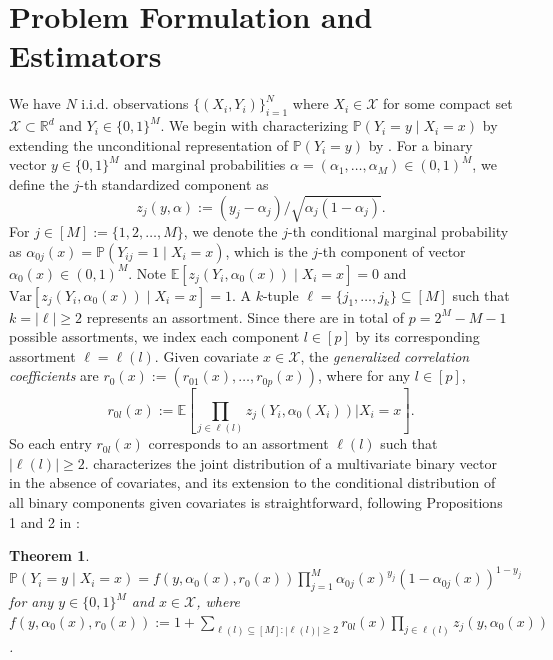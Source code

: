 \documentclass[11pt]{article}
\newtheorem{theorem}{Theorem}
\begin{document}
\section{Problem Formulation and Estimators}\label{Sec:Setup}
We have $N$ i.i.d. observations $\{(X_i,Y_i)\}_{i=1}^N$ where $X_i\in\mathcal{X}$ for some compact set $\mathcal{X}\subset\mathbb{R}^d$ and $Y_i \in\{0,1\}^M$. We begin with characterizing $\mathbb{P}(Y_i = y \mid X_i = x)$ by extending the unconditional representation of $\mathbb{P}(Y_i = y)$ by \citet{bahadur1959representation}. For a binary vector $y \in \{0,1\}^M$ and marginal probabilities $\alpha=(\alpha_1,\ldots,\alpha_M)\in (0,1)^M$, we define the $j$-th standardized component as 
\begin{equation}\label{eq:z}
\displaystyle z_j(y,\alpha):=(y_{j}-\alpha_j)/\sqrt{\alpha_j(1-\alpha_j)}.
\end{equation}
For $j\in[M]:=\{1,2,\ldots,M\}$, we denote the $j$-th conditional marginal probability as $\alpha_{0j}(x) = \mathbb{P}(Y_{ij}=1 \mid X_i=x)$, which is the $j$-th component of vector $\alpha_0(x)\in(0,1)^M$. Note $\mathbb{E}[ z_j(Y_i,\alpha_0(x))\mid X_i=x]=0$ and $\mathrm{Var}[ z_j(Y_i,\alpha_0(x))\mid X_i=x]=1$. A $k$-tuple $ \ell = \{j_1,\ldots,j_k\} \subseteq [M]$ such that $k=|\ell|\geq 2$ represents an assortment. Since there are in total of $p=2^M-M-1$ possible assortments, we index each component $l \in [p]$ by its corresponding assortment $\ell = \ell(l)$. Given covariate $x\in\mathcal X$, the \textit{generalized correlation coefficients} are $r_0(x):=\left(r_{01}(x),\ldots,r_{0p}(x)\right)$, where for any $l\in [p]$, 
\begin{equation}\label{def:r0}
r_{0l}(x):= \mathbb{E}\left[ \prod_{j\in\ell(l)}z_j(Y_{i},\alpha_0(X_i)) \bigg| X_i=x\right].
\end{equation}
So each entry $r_{0l}(x)$ corresponds to an assortment $\ell(l)$ such that $|\ell(l)|\geq2$.  \citet{bahadur1959representation} characterizes the joint distribution of a multivariate binary vector in the absence of covariates, and its extension to the conditional distribution of all binary components given covariates is straightforward, following Propositions 1 and 2 in \citet{bahadur1959representation}:
\begin{theorem}\label{Thm:Bahadur}
$\mathbb{P}(Y_i = y \mid X_i=x )= f(y,\alpha_0(x),r_0(x))\prod_{j=1}^M \alpha_{0j}(x)^{y_j}(1-\alpha_{0j}(x))^{1-y_j}$ for any $y \in \{0,1\}^M$ and $x \in \mathcal{X}$, where $\displaystyle f(y,\alpha_0(x),r_0(x)):= 1 + \sum_{\ell(l)\subseteq [M] : \left|\ell(l)\right|\geq2} r_{0l}(x)\prod_{j\in\ell(l)} z_{j}(y,\alpha_0(x))$. 
\end{theorem}
\end{document}

